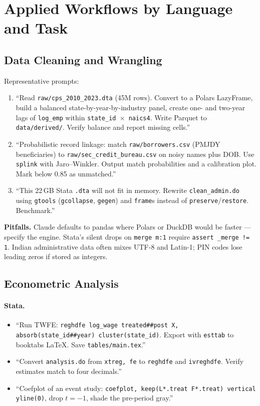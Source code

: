 \documentclass[11pt]{article}
\begin{document}
\section{Applied Workflows by Language and Task}\label{sec:workflows}

\subsection{Data Cleaning and Wrangling}

Representative prompts:
\begin{enumerate}[leftmargin=*,nosep]
    \item ``Read \texttt{raw/cps\_2010\_2023.dta} (45M rows). Convert to a Polars LazyFrame, build a balanced state-by-year-by-industry panel, create one- and two-year lags of \texttt{log\_emp} within \texttt{state\_id $\times$ naics4}. Write Parquet to \texttt{data/derived/}. Verify balance and report missing cells.''
    \item ``Probabilistic record linkage: match \texttt{raw/borrowers.csv} (PMJDY beneficiaries) to \texttt{raw/sec\_credit\_bureau.csv} on noisy names plus DOB. Use \texttt{splink} with Jaro--Winkler. Output match probabilities and a calibration plot. Mark below 0.85 as unmatched.''
    \item ``This 22\,GB Stata \texttt{.dta} will not fit in memory. Rewrite \texttt{clean\_admin.do} using \texttt{gtools} (\texttt{gcollapse}, \texttt{gegen}) and \texttt{frame}s instead of \texttt{preserve}/\texttt{restore}. Benchmark.''
\end{enumerate}

\textbf{Pitfalls.} Claude defaults to pandas where Polars or DuckDB would be faster --- specify the engine. Stata's silent drops on \texttt{merge m:1} require \texttt{assert \_merge != 1}. Indian administrative data often mixes UTF-8 and Latin-1; PIN codes lose leading zeros if stored as integers.

\subsection{Econometric Analysis}

\paragraph{Stata.}
\begin{itemize}[leftmargin=*,nosep]
    \item ``Run TWFE: \texttt{reghdfe log\_wage treated\#\#post X, absorb(state\_id\#\#year) cluster(state\_id)}. Export with \texttt{esttab} to booktabs LaTeX. Save \texttt{tables/main.tex}.''
    \item ``Convert \texttt{analysis.do} from \texttt{xtreg, fe} to \texttt{reghdfe} and \texttt{ivreghdfe}. Verify estimates match to four decimals.''
    \item ``Coefplot of an event study: \texttt{coefplot, keep(L*.treat F*.treat) vertical yline(0)}, drop $t=-1$, shade the pre-period gray.''
\end{itemize}
\end{document}

